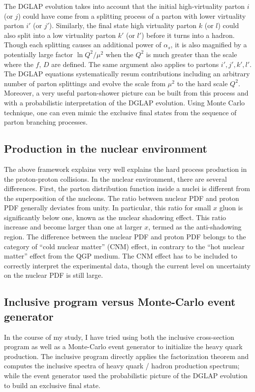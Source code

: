 The DGLAP evolution takes into account that the initial high-virtuality parton $i$ (or $j$) could have come from a splitting process of a parton with lower virtuality parton $i'$ (or $j'$).
Similarly, the final state high virtuality parton $k$ (or $l$) could also split into a low virtuality parton $k'$ (or $l'$) before it turns into a hadron.
Though each splitting causes an additional power of $\alpha_s$, it is also magnified by a potentially large factor $\ln Q^2/\mu^2$ when the $Q^2$ is much greater than the scale where the $f$, $D$ are defined.
The same argument also applies to partons $i', j', k', l'$. 
The DGLAP equations systematically resum contributions including an arbitrary number of parton splittings and evolve the scale from $\mu^2$ to the hard scale $Q^2$.
Moreover, a very useful parton-shower picture can be built from this process and with a probabilistic interpretation of the DGLAP evolution. Using Monte Carlo technique, one can even mimic the exclusive final states from the sequence of parton branching processes.

\subsection{Production in the nuclear environment}
The above framework explains very well explains the hard process production in the proton-proton collisions.
In the nuclear environment, there are several differences.
First, the parton distribution function inside a nuclei is different from the superposition of the nucleons.
The ratio between nuclear PDF and proton PDF generally deviates from unity.
In particular, this ratio for small $x$ gluon is significantly below one, known as the nuclear shadowing effect. 
This ratio increase and become larger than one at larger $x$, termed as the anti-shadowing region.
The difference between the nuclear PDF and proton PDF belongs to the category of ``cold nuclear matter'' (CNM) effect, in contrary to the ``hot nuclear matter'' effect from the QGP medium.
The CNM effect has to be included to correctly interpret the experimental data, though the current level on uncertainty on the nuclear PDF is still large.

\subsection{Inclusive program versus Monte-Carlo event generator}
In the course of my study, I have tried using both the inclusive cross-section program as well as a Monte-Carlo event generator to initialize the heavy quark production.
The inclusive program directly applies the factorization theorem and computes the inclusive spectra of heavy quark / hadron production spectrum; while the event generator used the probabilistic picture of the DGLAP evolution to build an exclusive final state.

